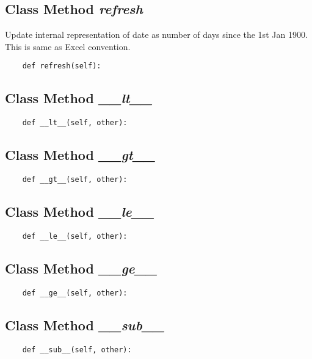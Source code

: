 \documentclass[twoside,11pt]{book}
\begin{document}
\subsection{Class Method {\it refresh}}
Update internal representation of date as number of days since the 1st Jan 1900. This is same as Excel convention. 

\begin{lstlisting}
    def refresh(self):
\end{lstlisting}

\subsection{Class Method {\it \_\_lt\_\_}}


\begin{lstlisting}
    def __lt__(self, other):
\end{lstlisting}

\subsection{Class Method {\it \_\_gt\_\_}}


\begin{lstlisting}
    def __gt__(self, other):
\end{lstlisting}

\subsection{Class Method {\it \_\_le\_\_}}


\begin{lstlisting}
    def __le__(self, other):
\end{lstlisting}

\subsection{Class Method {\it \_\_ge\_\_}}


\begin{lstlisting}
    def __ge__(self, other):
\end{lstlisting}

\subsection{Class Method {\it \_\_sub\_\_}}


\begin{lstlisting}
    def __sub__(self, other):
\end{lstlisting}
\end{document}
